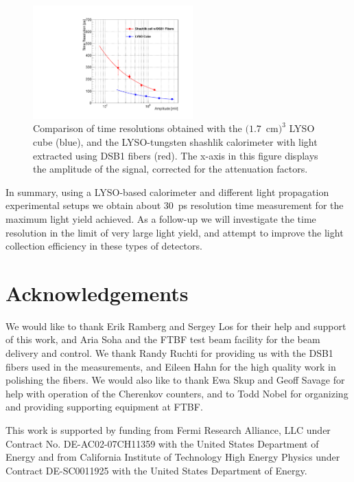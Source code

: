 \documentclass[12pt]{article}
\begin{document}
\begin{figure}[H] \centering
\includegraphics[width=0.55\textwidth]{figs/TimeResolutionVsEnergy_ShashlikDSB1FiberAndCube} 
\caption{\small Comparison of time resolutions obtained with the $(1.7$~cm$)^{3}$ LYSO cube (blue), 
and the LYSO-tungsten shashlik calorimeter with light extracted using DSB1 fibers (red). 
 The x-axis in this figure displays the amplitude of the
signal, corrected for the attenuation factors. }
\label{fig:ShashlikFiberAndCubeTOF}
\end{figure}

In summary, using a LYSO-based calorimeter and different light propagation experimental setups 
we obtain about $30$~ps resolution time measurement for the maximum light yield achieved. 
As a follow-up we will investigate the time resolution in the limit of very large light yield, 
and attempt to improve the light collection efficiency in these types of detectors.

\section{Acknowledgements} We would like to thank Erik Ramberg and Sergey Los for their help and support of this work, and Aria Soha and the FTBF test beam facility for
the beam delivery and control. We thank Randy Ruchti for providing us with
the DSB1 fibers used in the measurements, and Eileen Hahn for the high quality
work in polishing the fibers. We would also like to thank Ewa Skup and Geoff Savage for help with
operation of the Cherenkov counters, and to Todd Nobel for organizing and providing
supporting equipment at FTBF.

This work is supported by funding from Fermi Research Alliance, LLC under Contract No. DE-AC02-07CH11359 with the United States Department of Energy and from California Institute of Technology High Energy Physics under Contract DE-SC0011925 with the United States Department of Energy. 


{}

\end{document}
